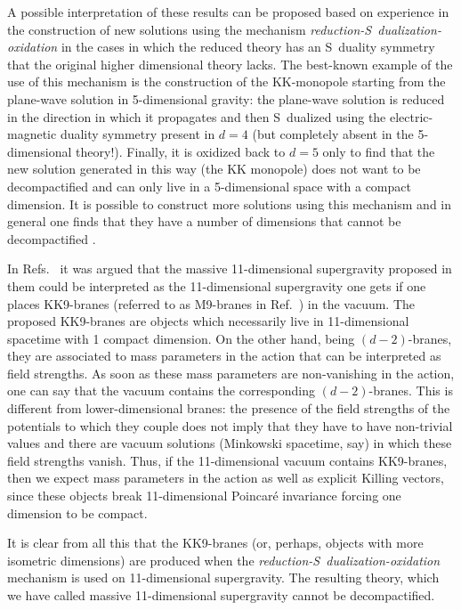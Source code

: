 \documentclass[12pt,a4paper]{article}
\begin{document}
A possible interpretation of these results can be proposed based on
experience in the construction of new solutions using the mechanism
{\it reduction-S~dualization-oxidation} in the cases in which the
reduced theory has an S~duality symmetry that the original higher
dimensional theory lacks. The best-known example of the use of this
mechanism is the construction of the KK-monopole \cite{kn:So,kn:GrPe}
starting from the plane-wave solution in 5-dimensional gravity: the
plane-wave solution is reduced in the direction in which it propagates
and then S~dualized using the electric-magnetic duality symmetry
present in $d=4$ (but completely absent in the 5-dimensional theory!).
Finally, it is oxidized back to $d=5$ only to find that the new
solution generated in this way (the KK monopole) does not want to be
decompactified and can only live in a 5-dimensional space with a
compact dimension. It is possible to construct more solutions using
this mechanism and in general one finds that they have a number of
dimensions that cannot be decompactified \cite{kn:L-TO2}.

In Refs.~\cite{kn:BLO,kn:MO} it was argued that the massive
11-dimensional supergravity proposed in them could be interpreted as
the 11-dimensional supergravity one gets if one places KK9-branes
(referred to as M9-branes in Ref.~\cite{kn:BvdS}) in the vacuum. The
proposed KK9-branes are objects which necessarily live in
11-dimensional spacetime with 1 compact dimension.  On the other hand,
being $(d-2)$-branes, they are associated to mass parameters in the
action that can be interpreted as field strengths. As soon as these
mass parameters are non-vanishing in the action, one can say that the
vacuum contains the corresponding $(d-2)$-branes. This is different
from lower-dimensional branes: the presence of the field strengths of
the potentials to which they couple does not imply that they have to
have non-trivial values and there are vacuum solutions (Minkowski
spacetime, say) in which these field strengths vanish. Thus, if the
11-dimensional vacuum contains KK9-branes, then we expect mass
parameters in the action as well as explicit Killing vectors, since
these objects break 11-dimensional Poincar\'e invariance forcing one
dimension to be compact.

It is clear from all this that the KK9-branes (or, perhaps, objects
with more isometric dimensions) are produced when the {\it
  reduction-S~dualization-oxidation} mechanism is used on
11-dimensional supergravity. The resulting theory, which we have called
massive 11-dimensional supergravity cannot be decompactified.
\end{document}
